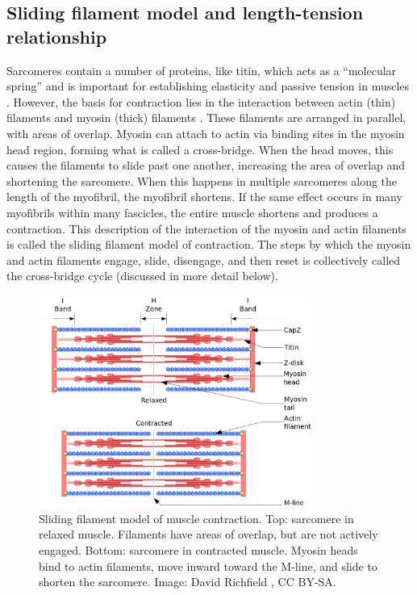 \documentclass[12pt]{article}
\begin{document}
\subsection*{Sliding filament model and length-tension relationship}
Sarcomeres contain a number of proteins, like titin, which acts as a ``molecular spring'' and is important for establishing elasticity and passive tension in muscles \cite{granzier2006giant}. However, the basis for contraction lies in the interaction between actin (thin) filaments and myosin (thick) filaments \cite{openStax2016contraction}. These filaments are arranged in parallel, with areas of overlap. Myosin can attach to actin via binding sites in the myosin head region, forming what is called a cross-bridge. When the head moves, this causes the filaments to slide past one another, increasing the area of overlap and shortening the sarcomere.
When this happens in multiple sarcomeres along the length of the myofibril, the myofibril shortens. If the same effect occurs in many myofibrils within many fascicles, the entire muscle shortens and produces a contraction. This description of the interaction of the myosin and actin filaments is called the sliding filament model of contraction. The steps by which the myosin and actin filaments engage, slide, disengage, and then reset is collectively called the cross-bridge cycle \cite{openStax2016contraction} (discussed in more detail below).
  
\begin{figure}[h!]
\centering
\includegraphics[width=0.8\textwidth]{figures/sarcomere.png}
\caption{Sliding filament model of muscle contraction. Top: sarcomere in relaxed muscle. Filaments have areas of overlap, but are not actively engaged. Bottom: sarcomere in contracted muscle. Myosin heads bind to actin filaments, move inward toward the M-line, and slide to shorten the sarcomere. Image: David Richfield \cite{richfieldSarcomere}, CC BY-SA.}
\label{fig:sarcomere}
\end{figure}
\end{document}
